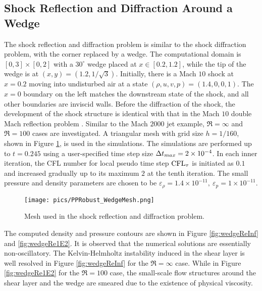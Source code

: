 \subsection{Shock Reflection and Diffraction Around a Wedge}

The shock reflection and diffraction problem \cite{zhang2017positivity} is similar to the shock diffraction problem,
with the corner replaced by a wedge. The computational domain is $[0,3]\times[0,2]$
with a $30^\circ$ wedge placed at $x\in[0.2,1.2]$, while the
tip of the wedge is at $(x,y) = (1.2, 1/\sqrt{3})$.
Initially, there is a Mach $10$ shock at $x=0.2$ moving into undisturbed air at a state $(\rho, u, v, p) = (1.4,0,0,1)$. The $x=0$ boundary on
the left matches the downstream state of the shock, and all other boundaries
are inviscid walls.
Before the diffraction of the shock, the development
of the shock structure is identical with that in the Mach $10$ double Mach reflection problem \cite{woodward1984dmr}.
Similar to the Mach $2000$ jet example, $\Re=\infty$ and $\Re=100$ cases
are investigated. A triangular mesh with grid size $h = 1/160$,
shown in Figure \ref{fig:wedgeMesh}, is used in the simulations.
The simulations are performed up to $t=0.245$ using
a user-specified time step size $\mathrm\Delta t_{max}= 2\times10^{-4}$.
In each inner iteration, the CFL number for local pseudo time step $\text{CFL}_\tau$ is initiated as $0.1$
and increased gradually up to its maximum $2$ at the tenth iteration.
The small pressure and density parameters are chosen to be
$\varepsilon_\rho = 1.4\times10^{-11},\ \varepsilon_p = 1\times10^{-11}$.

\begin{figure}[htbp]
    \centering
    \texttt{[image: pics/PPRobust\_WedgeMesh.png]}
    \caption{Mesh used in the shock reflection and diffraction problem.}
    \label{fig:wedgeMesh}
\end{figure}

The computed density and pressure contours are shown in Figure \ref{fig:wedgeReInf} and \ref{fig:wedgeRe1E2}.
It is observed that the numerical solutions are essentially non-oscillatory.
The Kelvin-Helmholtz instability induced in the shear layer is well resolved in Figure \ref{fig:wedgeReInf} for the $\Re=\infty$ case.
While in Figure  \ref{fig:wedgeRe1E2} for the $\Re=100$ case,
the small-scale flow structures around the shear layer and the wedge are smeared  due to the existence of physical viscosity.

